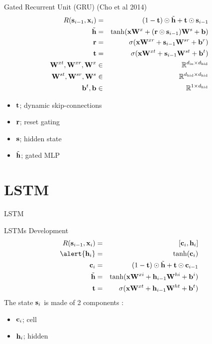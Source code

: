 \documentclass{beamer}
\begin{document}
\begin{frame}{Gated Recurrent Unit (GRU) (Cho et al 2014)}
    \begin{eqnarray*}
      R(\mathbf{s}_{i-1}, \mathbf{x}_i) &=& (1-\mathbf{t}) \odot \tilde{\mathbf{h}} + \mathbf{t} \odot \mathbf{s}_{i-1} \\
      \tilde{\mathbf{h}} &=& \tanh(\mathbf{x} \mathbf{W}^x + (\mathbf{r} \odot \mathbf{s}_{i-1})  \mathbf{W}^s + \mathbf{b})  \\
      \mathbf{r} &=& \sigma(\mathbf{x} \mathbf{W}^{xr} + \mathbf{s}_{i-1}\mathbf{W}^{sr} + \mathbf{b}^r) \\
      \mathbf{t} &=& \sigma(\mathbf{x} \mathbf{W}^{xt} + \mathbf{s}_{i-1}\mathbf{W}^{st} + \mathbf{b}^t) \\
      \mathbf{W}^{xt}, \mathbf{W}^{xr}, \mathbf{W}^{x} &\in& \mathbb{R}^{{d_{\mathrm{in}}} \times {d_{\mathrm{hid}}}} \\
      \mathbf{W}^{st}, \mathbf{W}^{sr}, \mathbf{W}^{s} &\in& \mathbb{R}^{{d_{\mathrm{hid}}} \times {d_{\mathrm{hid}}}} \\
      \mathbf{b}^t, \mathbf{b} &\in& \mathbb{R}^{1 \times {d_{\mathrm{hid}}}} \\
    \end{eqnarray*}

    \begin{itemize}
    \item $\mathbf{t}$; dynamic skip-connections
    \item $\mathbf{r}$; reset gating
    \item $\mathbf{s}$; hidden state
    \item $\tilde{\mathbf{h}}$; gated MLP
    \end{itemize}
\end{frame}

\section{LSTM}

\begin{frame}{LSTM}
  
\end{frame}

\begin{frame}{LSTMs Development}
    \begin{eqnarray*}
      R(\bolds_{i-1}, \boldx_i) &=& [\boldc_i, \boldh_i]  \\
      \alert{\boldh_i} &=& \tanh(\boldc_i) \\ 
      \boldc_i &=& (1-\boldt) \odot \tilde{\boldh}  + \boldt \odot \bold c_{i-1}    \\
      \tilde{\boldh} &=& \tanh(\boldx \boldW^{xi} + \boldh_{i-1}\boldW^{hi} + \boldb^i) \\
      \boldt &=& \sigma(\boldx \boldW^{xt} + \boldh_{i-1}\boldW^{ht} + \boldb^t) \\
    \end{eqnarray*}
  The state $\mathbf{s}_i$ is made of 2 components :
  \begin{itemize}
  \item $\mathbf{c}_i$; cell
  \item $\mathbf{h}_i$; hidden
  \end{itemize}

\end{frame}
\end{document}
